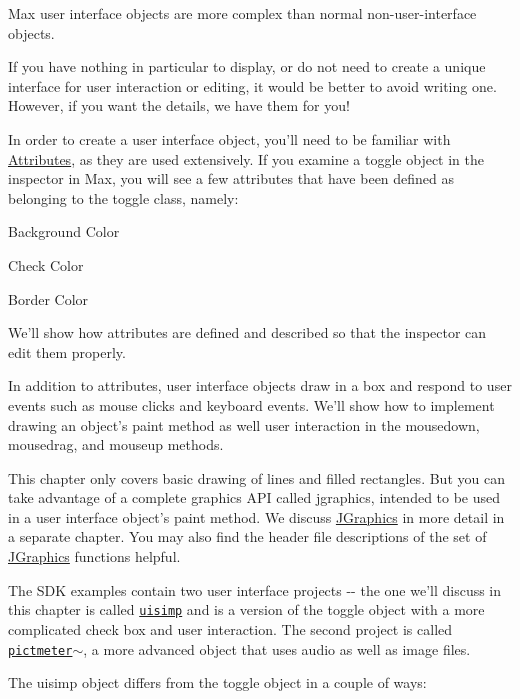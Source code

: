Max user interface objects are more complex than normal non-\/user-\/interface objects.

If you have nothing in particular to display, or do not need to create a unique interface for user interaction or editing, it would be better to avoid writing one. However, if you want the details, we have them for you!

In order to create a user interface object, you'll need to be familiar with \hyperlink{group__attr}{Attributes}, as they are used extensively. If you examine a toggle object in the inspector in Max, you will see a few attributes that have been defined as belonging to the toggle class, namely:


\begin{DoxyItemize}
\item Background Color
\item Check Color
\item Border Color
\end{DoxyItemize}

We'll show how attributes are defined and described so that the inspector can edit them properly.

In addition to attributes, user interface objects draw in a box and respond to user events such as mouse clicks and keyboard events. We'll show how to implement drawing an object's paint method as well user interaction in the mousedown, mousedrag, and mouseup methods.

This chapter only covers basic drawing of lines and filled rectangles. But you can take advantage of a complete graphics API called jgraphics, intended to be used in a user interface object's paint method. We discuss \hyperlink{chapter_jgraphics}{JGraphics} in more detail in a separate chapter. You may also find the header file descriptions of the set of \hyperlink{group__jgraphics}{JGraphics} functions helpful.

The SDK examples contain two user interface projects -\/-\/ the one we'll discuss in this chapter is called \href{uisimp_8c-source.html}{\tt uisimp} and is a version of the toggle object with a more complicated check box and user interaction. The second project is called \href{pictmeter~_8c-source.html}{\tt pictmeter$\sim$}, a more advanced object that uses audio as well as image files.

The uisimp object differs from the toggle object in a couple of ways:


